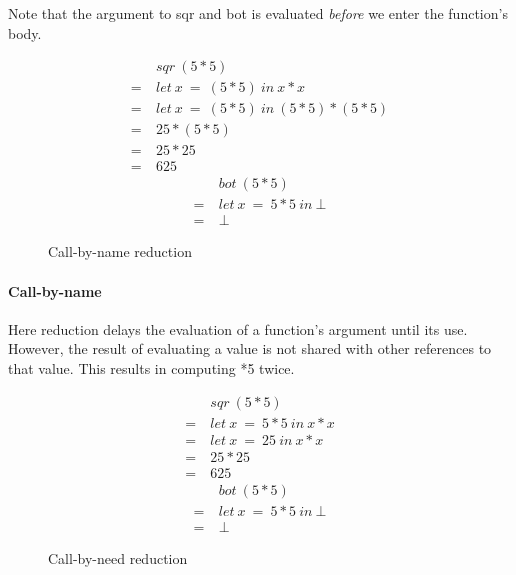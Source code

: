 Note that the argument to \<sqr\> and \<bot\> is evaluated \emph{before}
we enter the function's body. 

\pagebreak

\begin{figure}[!h]
\centering
\begin{multicols}{2}
\noindent
\begin{align*}
     &sqr\ (5*5) \\
  =\ &let\ x \  =\ (5*5)\ in\ x * x \\
  =\ &let\ x \  =\ (5*5)\ in\ (5*5) * (5*5) \\
  =\ &25 * (5*5) \\
  =\ &25 * 25 \\
  =\ &625
\end{align*}
\begin{align*}
     &bot\ (5*5) \\
  =\ &let\ x\ =\ 5*5\ in\ \bot \\
  =\ &\bot
\end{align*}
\end{multicols}
\caption{Call-by-name reduction}
\label{fig:call-by-name}
\end{figure}

\paragraph{Call-by-name} Here reduction delays the evaluation of a function's
argument until its use.  However, the result of evaluating a value is not
shared with other references to that value. This results in computing *5\>
twice.

\begin{figure}[!h]
\centering
\begin{multicols}{2}
\noindent
\begin{align*}
     &sqr\ (5*5) \\
  =\ &let\ x\ =\ 5 * 5\ in\ x * x \\
  =\ &let\ x\ =\ 25\ in\ x * x \\
  =\ &25 * 25 \\
  =\ &625
\end{align*}
\begin{align*}
     &bot\ (5*5) \\
  =\ &let\ x\ =\ 5*5\ in\ \bot \\
  =\ &\bot
\end{align*}
\end{multicols}
\caption{Call-by-need reduction}
\label{fig:call-by-need}
\end{figure}

